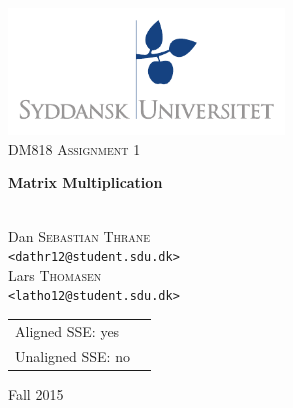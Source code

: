 \documentclass[a4paper.11pt,oneside]{book}
\title{}
\author{}
\date{}
\begin{document}
\begin{titlepage}
\begin{center}

\thispagestyle{empty}
\includegraphics[width=0.55\textwidth]{logo.pdf}\\[1cm]    
\textsc{\Large DM818 Assignment 1}\\[0.5cm]

\begin{Huge}
\textbf{Matrix Multiplication}
\end{Huge}

\vspace{4cm}

\begin{minipage}{1\textwidth}
\begin{center}
\emph{}\\

Dan \textsc{Sebastian Thrane}\\
\verb!<dathr12@student.sdu.dk>!\\

Lars \textsc{Thomasen}\\
\verb!<latho12@student.sdu.dk>!\\

\end{center}
\end{minipage}
\begin{minipage}{0.4\textwidth}
\end{minipage}

\vfill
\begin{tabular}{ll}
    Aligned SSE: yes \\
    Unaligned SSE: no \\
\end{tabular}
\vfill

{\large Fall 2015}\\

\end{center}
\end{titlepage}
\end{document}
